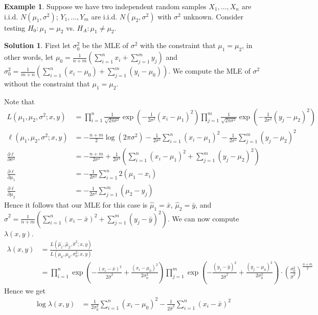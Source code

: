 \documentclass[11pt]{amsart}
\theoremstyle{definition}
\newtheorem{example}[theorem]{Example}
\newtheorem{solution}[theorem]{Solution}
\numberwithin{equation}{section}
\begin{document}
\begin{example}
    Suppose we have two independent random samples $X_1,\ldots,X_n$ are i.i.d. $N(\mu_1,\sigma^2)$; $Y_1,\ldots,Y_m$ are i.i.d. $N(\mu_2,\sigma^2)$ with $\sigma^2$ unknown. Consider testing $H_0:\mu_1=\mu_2$ vs. $H_A:\mu_1\ne\mu_2$. 
\end{example}
\addtocounter{theorem}{-1}
\begin{solution}
    First let $\sigma_0^2$ be the MLE of $\sigma^2$ with the constraint that $\mu_1=\mu_2$, in other words, let $\mu_0=\frac{1}{n+m}(\sum_{i=1}^nx_i+\sum_{j=1}^my_j)$ and $\sigma_0^2=\frac{1}{m+n}(\sum_{i=1}^n(x_i-\mu_0)+\sum_{j=1}^m(y_i-\mu_0))$. We compute the MLE of $\sigma^2$ without the constraint that $\mu_1=\mu_2$.

    Note that 
    \begin{align*}
        L(\mu_1,\mu_2,\sigma^2;x,y)&=\prod_{i=1}^n\frac{1}{\sqrt{2\pi\sigma^2}}\exp(-\frac{1}{2\sigma^2}(x_i-\mu_1)^2)\prod_{j=1}^m\frac{1}{\sqrt{2\pi\sigma^2}}\exp(-\frac{1}{2\sigma^2}(y_j-\mu_2)^2)\\
        \ell(\mu_1,\mu_2,\sigma^2;x,y)&=-\frac{n+m}{2}\log(2\pi\sigma^2)-\frac{1}{2\sigma^2}\sum_{i=1}^n(x_i-\mu_1)^2-\frac{1}{2\sigma^2}\sum_{j=1}^m(y_j-\mu_2)^2\\
        \frac{\partial\ell}{\partial\sigma^2}&=-\frac{n+m}{2\sigma^2}+\frac{1}{2\sigma^4}(\sum_{i=1}^n(x_i-\mu_1)^2+\sum_{j=1}^m(y_j-\mu_2)^2)\\
        \frac{\partial\ell}{\partial\mu_1}&=-\frac{1}{2\sigma^2}\sum_{i=1}^n2(\mu_1-x_i)\\
        \frac{\partial\ell}{\partial\mu_2}&=-\frac{1}{2\sigma^2}\sum_{j=1}^m(\mu_2-y_j)
    \end{align*}
    Hence it follows that our MLE for this case is $\hat\mu_1=\bar x$, $\hat\mu_2=\bar y$, and $\hat\sigma^2=\frac{1}{n+m}(\sum_{i=1}^n(x_i-\bar x)^2+\sum_{j=1}^m(y_j-\bar y)^2)$. We can now compute $\lambda(x,y)$.
    \begin{align*}
        \lambda(x,y)&=\frac{L(\hat\mu_1,\hat\mu_2,\hat\sigma^2;x,y)}{L(\mu_0,\mu_0,\sigma^2_0;x,y)}\\
        &=\prod_{i=1}^n\exp(-\frac{(x_i-\bar x)^2}{2\hat\sigma^2}+\frac{(x_i-\mu_0)^2}{2\sigma_0^2})\prod_{j=1}^m\exp(-\frac{(y_j-\bar y)^2}{2\hat\sigma^2}+\frac{(y_j-\mu_0)^2}{2\sigma_0^2})\cdot\left(\frac{\sigma_0^2}{\hat\sigma^2}\right)^\frac{n+m}{2}
    \end{align*}
    Hence we get
    \begin{align*}
        \log\lambda(x,y)&=\frac{1}{2\sigma_0^2}\sum_{i=1}^n(x_i-\mu_0)^2-\frac{1}{2\hat\sigma^2}\sum_{i=1}^n(x_i-\bar x)^2\\

\end{align*}
\end{solution}
\end{document}
